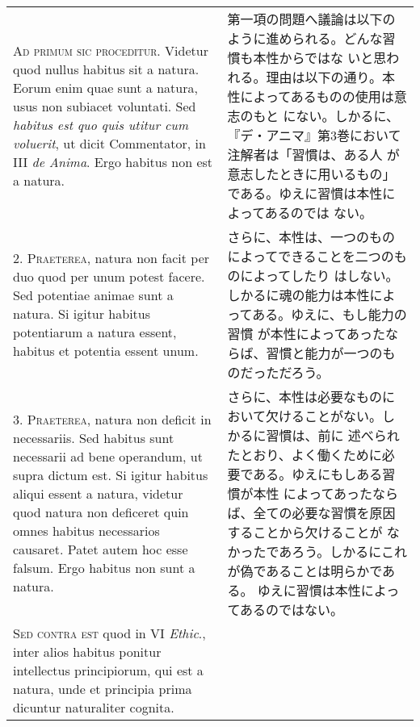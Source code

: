 \documentclass[10pt]{jsarticle} %
\begin{document}
\begin{longtable}{p{21em}p{21em}}


{\scshape Ad primum sic proceditur}. Videtur quod nullus habitus sit a
natura. Eorum enim quae sunt a natura, usus non subiacet
 voluntati. Sed {\itshape habitus est quo quis utitur cum voluerit}, ut dicit
 Commentator, in III {\itshape de Anima}. Ergo habitus non est a natura.

&

第一項の問題へ議論は以下のように進められる。どんな習慣も本性からではな
いと思われる。理由は以下の通り。本性によってあるものの使用は意志のもと
にない。しかるに、『デ・アニマ』第3巻において注解者は「習慣は、ある人
が意志したときに用いるもの」である。ゆえに習慣は本性によってあるのでは
ない。

\\



2. {\scshape Praeterea}, natura non facit per duo quod per unum potest
facere. Sed potentiae animae sunt a natura. Si igitur habitus
potentiarum a natura essent, habitus et potentia essent unum.


&

さらに、本性は、一つのものによってできることを二つのものによってしたり
 はしない。しかるに魂の能力は本性によってある。ゆえに、もし能力の習慣
 が本性によってあったならば、習慣と能力が一つのものだっただろう。

\\





3. {\scshape Praeterea}, natura non deficit in necessariis. Sed habitus sunt
 necessarii ad bene operandum, ut supra dictum est. Si igitur habitus
 aliqui essent a natura, videtur quod natura non deficeret quin omnes
 habitus necessarios causaret. Patet autem hoc esse falsum. Ergo
 habitus non sunt a natura.


&

さらに、本性は必要なものにおいて欠けることがない。しかるに習慣は、前に
 述べられたとおり、よく働くために必要である。ゆえにもしある習慣が本性
 によってあったならば、全ての必要な習慣を原因することから欠けることが
 なかったであろう。しかるにこれが偽であることは明らかである。
ゆえに習慣は本性によってあるのではない。

\\





{\scshape Sed contra est} quod in VI {\itshape Ethic}., inter alios habitus ponitur
 intellectus principiorum, qui est a natura, unde et principia prima
 dicuntur naturaliter cognita.


\end{longtable}
\end{document}
